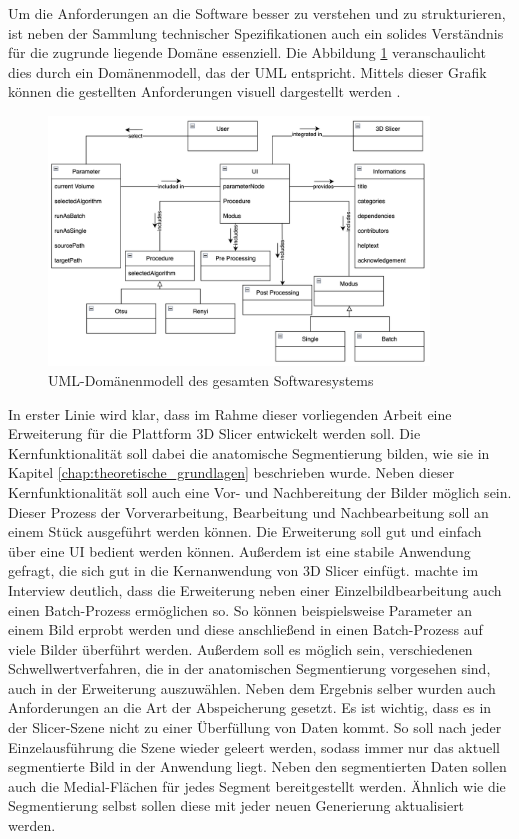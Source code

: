Um die Anforderungen an die Software besser zu verstehen und zu strukturieren,
ist neben der Sammlung technischer Spezifikationen auch ein solides Verständnis
für die zugrunde liegende Domäne essenziell. Die Abbildung \ref{fig:3d_slicer_domäne}
veranschaulicht dies durch ein Domänenmodell, das der \ac{UML} entspricht.
Mittels dieser Grafik können die gestellten Anforderungen visuell dargestellt
werden \citep[vgl.][]{walter2025}.

\begin{figure}[h]
	\centering
	\includegraphics[width=0.9\textwidth]{img/domaene.png}
	\caption{UML-Domänenmodell des gesamten Softwaresystems}
	\label{fig:3d_slicer_domäne}
\end{figure}

In erster Linie wird klar, dass im Rahme dieser vorliegenden Arbeit eine Erweiterung
für die Plattform 3D Slicer entwickelt werden soll. Die Kernfunktionalität soll
dabei die anatomische Segmentierung bilden, wie sie in Kapitel \ref{chap:theoretische_grundlagen}
beschrieben wurde. Neben dieser Kernfunktionalität soll auch eine Vor- und Nachbereitung
der Bilder möglich sein. Dieser Prozess der Vorverarbeitung, Bearbeitung und Nachbearbeitung
soll an einem Stück ausgeführt werden können. Die Erweiterung soll gut und
einfach über eine \ac{UI} bedient werden können. Außerdem ist eine stabile
Anwendung gefragt, die sich gut in die Kernanwendung von 3D Slicer einfügt.
\citet[]{walter2025} machte im Interview deutlich, dass die Erweiterung neben
einer Einzelbildbearbeitung auch einen Batch-Prozess ermöglichen so. So können beispielsweise
Parameter an einem Bild erprobt werden und diese anschließend in einen Batch-Prozess
auf viele Bilder überführt werden. Außerdem soll es möglich sein, verschiedenen Schwellwertverfahren,
die in der anatomischen Segmentierung vorgesehen sind, auch in der Erweiterung auszuwählen.
Neben dem Ergebnis selber wurden auch Anforderungen an die Art der Abspeicherung
gesetzt. Es ist wichtig, dass es in der Slicer-Szene nicht zu einer Überfüllung
von Daten kommt. So soll nach jeder Einzelausführung die Szene wieder geleert werden,
sodass immer nur das aktuell segmentierte Bild in der Anwendung liegt. Neben den
segmentierten Daten sollen auch die Medial-Flächen für jedes Segment bereitgestellt
werden. Ähnlich wie die Segmentierung selbst sollen diese mit jeder neuen
Generierung aktualisiert werden.

